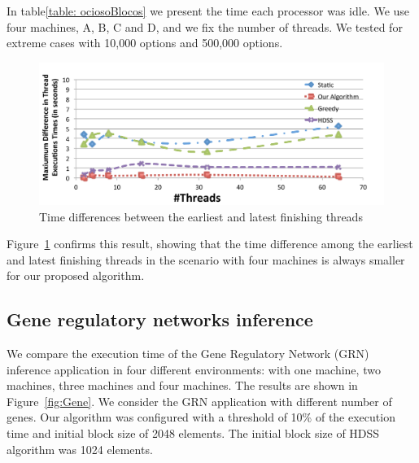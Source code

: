 \documentclass[journal]{IEEEtran}
\begin{document}
In table\ref{table: ociosoBlocos} we present the time each processor was idle. We use four machines, A, B, C and D, and we fix the number of threads. We tested for extreme cases with 10,000 options and 500,000 options.

\begin{figure}[htb]
	\begin{center}
	\centering
			\includegraphics[scale=0.33]{MaximoDiferenca_black_novo.pdf}
	\caption{Time differences between the earliest and latest finishing threads}
	\label{fig:diferencaThreadsBlack}
	\end{center}
\end{figure}

Figure~\ref{fig:diferencaThreadsBlack} confirms this result, showing that the
time difference among the earliest and latest finishing threads in the
scenario with four machines is always smaller for our proposed algorithm.


\subsection{Gene regulatory networks inference}

We compare the execution time of the Gene Regulatory Network (GRN) inference
application in four different environments: with one machine, two machines,
three machines and four machines. The results are shown in
Figure~\ref{fig:Gene}. We consider the GRN application with different number of
genes. Our algorithm was configured with a threshold of 10\% of the execution time and initial block size of 2048 elements. The initial block size of HDSS algorithm was 1024 elements.



\end{document}
